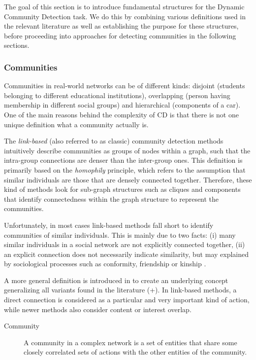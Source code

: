 \documentclass[
acmsmall,
nonacm,
screen,
acmthm]{../../scripts/pandoc/templates/acmart}
\begin{document}
The goal of this section is to introduce fundamental structures for the
Dynamic Community Detection task. We do this by combining various
definitions used in the relevant literature as well as establishing the
purpose for these structures, before proceeding into approaches for
detecting communities in the following sections.

\hypertarget{communities}{%
\subsubsection{Communities}\label{communities}}

Communities in real-world networks can be of different kinds: disjoint
(students belonging to different educational institutions), overlapping
(person having membership in different social groups) and hierarchical
(components of a car). One of the main reasons behind the complexity of
CD is that there is not one unique definition what a community actually
is.

The \emph{link-based} (also referred to as classic) community detection
methods intuitively describe communities as groups of nodes within a
graph, such that the intra-group connections are denser than the
inter-group ones. This definition is primarily based on the
\emph{homophily} principle, which refers to the assumption that similar
individuals are those that are densely connected together. Therefore,
these kind of methods look for sub-graph structures such as cliques and
components that identify connectedness within the graph structure to
represent the communities.

Unfortunately, in most cases link-based methods fall short to identify
communities of similar individuals. This is mainly due to two facts: (i)
many similar individuals in a social network are not explicitly
connected together, (ii) an explicit connection does not necessarily
indicate similarity, but may explained by sociological processes such as
conformity, friendship or kinship
\citep{diehlRelationshipIdentificationSocial2007, faniUserCommunityDetection2020}.

A more general definition is introduced in
\citep{cosciaClassificationCommunityDiscovery2011} to create an
underlying concept generalizing all variants found in the literature
(+\citet{thm:community}). In link-based methods, a direct connection is
considered as a particular and very important kind of action, while
newer methods also consider content or interest overlap.

\begin{description}
\item[\protect\hypertarget{thm:community}{}{Community}]
A community in a complex network is a set of entities that share some
closely correlated sets of actions with the other entities of the
community.
\end{description}
\end{document}

